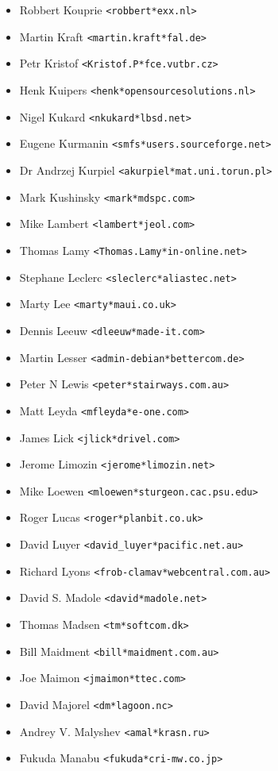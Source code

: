 \documentclass[a4paper,titlepage,12pt]{article}
\newcommand{\email}[1]{\texttt{#1}}
\begin{document}
\begin{itemize}
	\item Robbert Kouprie \email{<robbert*exx.nl>}
	\item Martin Kraft \email{<martin.kraft*fal.de>}
	\item Petr Kristof \email{<Kristof.P*fce.vutbr.cz>}
	\item Henk Kuipers \email{<henk*opensourcesolutions.nl>}
	\item Nigel Kukard \email{<nkukard*lbsd.net>}
	\item Eugene Kurmanin \email{<smfs*users.sourceforge.net>}
	\item Dr Andrzej Kurpiel \email{<akurpiel*mat.uni.torun.pl>}
	\item Mark Kushinsky \email{<mark*mdspc.com>}
	\item Mike Lambert \email{<lambert*jeol.com>}
	\item Thomas Lamy \email{<Thomas.Lamy*in-online.net>}
	\item Stephane Leclerc \email{<sleclerc*aliastec.net>}
	\item Marty Lee \email{<marty*maui.co.uk>}
	\item Dennis Leeuw \email{<dleeuw*made-it.com>}
	\item Martin Lesser \email{<admin-debian*bettercom.de>}
	\item Peter N Lewis \email{<peter*stairways.com.au>}
	\item Matt Leyda \email{<mfleyda*e-one.com>}
	\item James Lick \email{<jlick*drivel.com>}
	\item Jerome Limozin \email{<jerome*limozin.net>}
	\item Mike Loewen \email{<mloewen*sturgeon.cac.psu.edu>}
	\item Roger Lucas \email{<roger*planbit.co.uk>}
	\item David Luyer \email{<david\_luyer*pacific.net.au>}
	\item Richard Lyons \email{<frob-clamav*webcentral.com.au>}
	\item David S. Madole \email{<david*madole.net>}
	\item Thomas Madsen \email{<tm*softcom.dk>}
	\item Bill Maidment \email{<bill*maidment.com.au>}
	\item Joe Maimon \email{<jmaimon*ttec.com>}
	\item David Majorel \email{<dm*lagoon.nc>}
	\item Andrey V. Malyshev \email{<amal*krasn.ru>}
	\item Fukuda Manabu \email{<fukuda*cri-mw.co.jp>}

\end{itemize}
\end{document}
